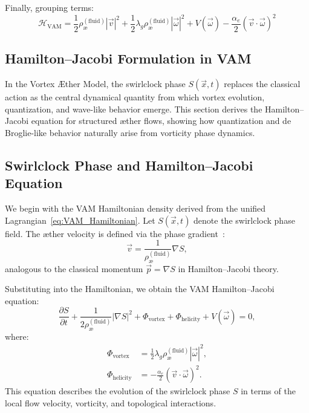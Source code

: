 Finally, grouping terms:
\begin{equation}
\boxed{
\mathcal{H}_\text{VAM} = \frac{1}{2} \rho_\text{\ae}^{(\text{fluid})} |\vec{v}|^2
+ \frac{1}{2} \lambda_g \rho_\text{\ae}^{(\text{fluid})} |\vec{\omega}|^2
+ V(\vec{\omega})
- \frac{\alpha_e}{2} (\vec{v} \cdot \vec{\omega})^2
}\label{eq:VAM_Hamiltonian}
\end{equation}

\subsection{ Hamilton--Jacobi Formulation in VAM}

In the Vortex \AE ther Model, the swirlclock phase \( S(\vec{x}, t) \) replaces the classical action as the central dynamical quantity from which vortex evolution, quantization, and wave-like behavior emerge. This section derives the Hamilton--Jacobi equation for structured \ae ther flows, showing how quantization and de Broglie-like behavior naturally arise from vorticity phase dynamics.

\subsection*{Swirlclock Phase and Hamilton--Jacobi Equation}

We begin with the VAM Hamiltonian density derived from the unified Lagrangian~\ref{eq:VAM_Hamiltonian}. Let \( S(\vec{x}, t) \) denote the swirlclock phase field. The \ae ther velocity is defined via the phase gradient~\cite{Arnold1998, moffatt1969degree}:
\begin{equation}
\vec{v} = \frac{1}{\rho_\text{\ae}^{(\text{fluid})}} \nabla S,
\end{equation}
analogous to the classical momentum \( \vec{p} = \nabla S \) in Hamilton–Jacobi theory.

Substituting into the Hamiltonian, we obtain the VAM Hamilton–Jacobi equation:
\begin{equation}
\frac{\partial S}{\partial t} + \frac{1}{2 \rho_\text{\ae}^{(\text{fluid})}} |\nabla S|^2
+ \Phi_\text{vortex} + \Phi_\text{helicity} + V(\vec{\omega}) = 0,
\end{equation}
where:
\begin{align*}
\Phi_\text{vortex} &= \frac{1}{2} \lambda_g \rho_\text{\ae}^{(\text{fluid})} |\vec{\omega}|^2, \\
\Phi_\text{helicity} &= -\frac{\alpha_e}{2} (\vec{v} \cdot \vec{\omega})^2.
\end{align*}
This equation describes the evolution of the swirlclock phase \( S \) in terms of the local flow velocity, vorticity, and topological interactions.


